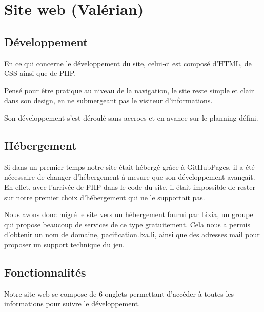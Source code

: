 \documentclass[12pt]{report}
\begin{document}
\chapter{Site web (Valérian)}

\section{Développement}

En ce qui concerne le développement du site, celui-ci est composé d’HTML, de CSS
ainsi que de PHP.

Pensé pour être pratique au niveau de la navigation, le site reste simple et
clair dans son design, en ne submergeant pas le visiteur d’informations. 

Son développement s’est déroulé sans accrocs et en avance sur le planning
défini.

\section{Hébergement}

Si dans un premier temps notre site était hébergé grâce à GitHubPages, il a été
nécessaire de changer d’hébergement à mesure que son développement avançait. En
effet, avec l’arrivée de PHP dans le code du site, il était impossible de rester
sur notre premier choix d'hébergement qui ne le supportait pas.

Nous avons donc migré le site vers un hébergement fourni par Lixia, un groupe
qui propose beaucoup de services de ce type gratuitement. Cela nous a permis
d’obtenir un nom de domaine, \url{pacification.lxa.li}, ainsi que des adresses
mail pour proposer un support technique du jeu. 

\section{Fonctionnalités}

Notre site web se compose de 6 onglets permettant d'accéder à toutes les
informations pour suivre le développement.
\end{document}
